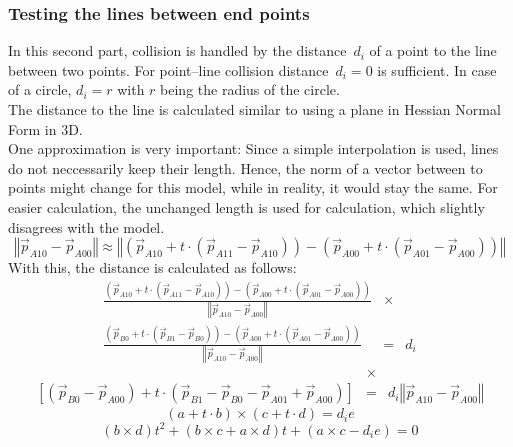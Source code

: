 \documentclass[a4paper,10pt]{scrartcl}
\newcommand{\norm}[1]{\left\Vert {#1} \right\Vert}
\begin{document}
\subsubsection{Testing the lines between end points}
In this second part, collision is handled by the distance~$d_i$ of a point to the line between
two points. For point--line collision distance~$d_i=0$ is sufficient.
In case of a circle, $d_i=r$ with $r$ being the radius of the circle.\\
The distance to the line is calculated similar to using a plane in Hessian Normal Form in 3D.\\
One approximation is very important: Since a simple interpolation is used, lines do not neccessarily
keep their length. Hence, the norm of a vector between to points might change for this model,
while in reality, it would stay the same. For easier calculation, the unchanged length
is used for calculation, which slightly disagrees with the model.
\begin{equation}
    \norm{\vec{p}_{A10} - \vec{p}_{A00}}
    \approx
    \norm{(\vec{p}_{A10} + t\cdot (\vec{p}_{A11} - \vec{p}_{A10})) -
          (\vec{p}_{A00} + t\cdot (\vec{p}_{A01} - \vec{p}_{A00}))}
\end{equation}
With this, the distance is calculated as follows:
\begin{eqnarray}
    \frac{(\vec{p}_{A10} + t\cdot (\vec{p}_{A11} - \vec{p}_{A10})) -
          (\vec{p}_{A00} + t\cdot (\vec{p}_{A01} - \vec{p}_{A00}))}
         {\norm{\vec{p}_{A10} - \vec{p}_{A00}}} & \times & \\
    \frac{(\vec{p}_{B0} + t \cdot (\vec{p}_{B1} - \vec{p}_{B0})) -
          (\vec{p}_{A00} + t\cdot (\vec{p}_{A01} - \vec{p}_{A00}))}
         {\norm{\vec{p}_{A10} - \vec{p}_{A00}}} & = & d_i
\end{eqnarray}
\begin{eqnarray}
    [(\vec{p}_{A10}-\vec{p}_{A00}) + 
     t\cdot (\vec{p}_{A11} - \vec{p}_{A10} - \vec{p}_{A01} + \vec{p}_{A00})]
          & \times & \\
    \left[(\vec{p}_{B0} - \vec{p}_{A00}) +
          t\cdot (\vec{p}_{B1} - \vec{p}_{B0} - \vec{p}_{A01} + \vec{p}_{A00})\right]
          & = & d_i \norm{\vec{p}_{A10} - \vec{p}_{A00}}
\end{eqnarray}
\begin{equation}
    (a + t\cdot b) \times (c + t\cdot d) = d_i e
\end{equation}
\begin{equation}
    (b \times d)t^2 + (b \times c + a \times d)t + (a \times c - d_i e) = 0
\end{equation}
\end{document}
